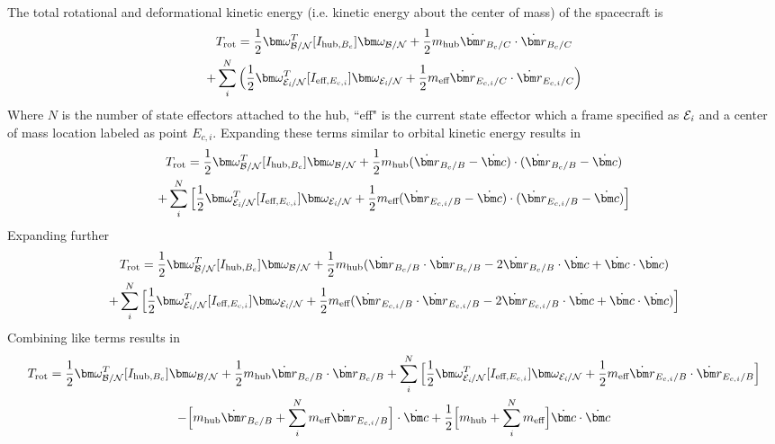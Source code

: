 The total rotational and deformational kinetic energy (i.e. kinetic energy about the center of mass) of the spacecraft is
\begin{multline}
T_{\text{rot}} = \frac{1}{2} \bm \omega_{\cal{B/N}}^T [I_{\text{hub},B_c}] \bm \omega_{\cal{B/N}} + \frac{1}{2} m_{\text{hub}} \dot{\bm r}_{B_c/C} \cdot \dot{\bm r}_{B_c/C} \\
+ \sum\limits_{i}^{N}\Big(\frac{1}{2} \bm \omega_{\cal{E}_{\textit{i}}/\cal{N}}^T [I_{\text{eff},E_{c,i}}] \bm \omega_{\cal{E}_{\textit{i}}/\cal{N}}
+ \frac{1}{2} m_{\text{eff}} \dot{\bm r}_{E_{c,i}/C} \cdot \dot{\bm r}_{E_{c,i}/C}\Big)
\end{multline}
Where $N$ is the number of state effectors attached to the hub, ``eff" is the current state effector which a frame specified as $\cal{E}_{\textit{i}}$ and a center of mass location labeled as point $E_{c,i}$. Expanding these terms similar to orbital kinetic energy results in
\begin{multline}
T_{\text{rot}} = \frac{1}{2} \bm \omega_{\cal{B/N}}^T [I_{\text{hub},B_c}] \bm \omega_{\cal{B/N}} + \frac{1}{2} m_{\text{hub}} (\dot{\bm r}_{B_c/B} - \dot{\bm c}) \cdot (\dot{\bm r}_{B_c/B} - \dot{\bm c}) \\
+ \sum\limits_{i}^{N}\Big[\frac{1}{2} \bm \omega_{\cal{E}_{\textit{i}}/\cal{N}}^T [I_{\text{eff},E_{c,i}}] \bm \omega_{\cal{E}_{\textit{i}}/\cal{N}}
+ \frac{1}{2} m_{\text{eff}} (\dot{\bm r}_{E_{c,i}/B} - \dot{\bm c}) \cdot (\dot{\bm r}_{E_{c,i}/B} - \dot{\bm c})\Big]
\end{multline}
Expanding further
\begin{multline}
T_{\text{rot}} = \frac{1}{2} \bm \omega_{\cal{B/N}}^T [I_{\text{hub},B_c}] \bm \omega_{\cal{B/N}} + \frac{1}{2} m_{\text{hub}} (\dot{\bm r}_{B_c/B}\cdot\dot{\bm r}_{B_c/B} - 2 \dot{\bm r}_{B_c/B} \cdot \dot{\bm c}  + \dot{\bm c} \cdot \dot{\bm c}) \\
+ \sum\limits_{i}^{N}\Big[\frac{1}{2} \bm \omega_{\cal{E}_{\textit{i}}/\cal{N}}^T [I_{\text{eff},E_{c,i}}] \bm \omega_{\cal{E}_{\textit{i}}/\cal{N}}
+ \frac{1}{2} m_{\text{eff}} (\dot{\bm r}_{E_{c,i}/B} \cdot \dot{\bm r}_{E_{c,i}/B} - 2 \dot{\bm r}_{E_{c,i}/B} \cdot \dot{\bm c} + \dot{\bm c} \cdot \dot{\bm c})\Big]
\end{multline}
Combining like terms results in
\begin{multline}
T_{\text{rot}} = \frac{1}{2} \bm \omega_{\cal{B/N}}^T [I_{\text{hub},B_c}] \bm \omega_{\cal{B/N}} + \frac{1}{2} m_{\text{hub}} \dot{\bm r}_{B_c/B}\cdot\dot{\bm r}_{B_c/B} + \sum\limits_{i}^{N}\Big[\frac{1}{2} \bm \omega_{\cal{E}_{\textit{i}}/\cal{N}}^T [I_{\text{eff},E_{c,i}}] \bm \omega_{\cal{E}_{\textit{i}}/\cal{N}}
+ \frac{1}{2} m_{\text{eff}}\dot{\bm r}_{E_{c,i}/B} \cdot \dot{\bm r}_{E_{c,i}/B} \Big]\\
- \Big[ m_{\text{hub}} \dot{\bm r}_{B_c/B} + \sum\limits_{i}^{N} m_{\text{eff}} \dot{\bm r}_{E_{c,i}/B} \Big] \cdot \dot{\bm c} + \frac{1}{2} \Big[m_{\text{hub}} + \sum\limits_{i}^{N} m_{\text{eff}} \Big]\dot{\bm c} \cdot \dot{\bm c}
\end{multline}
